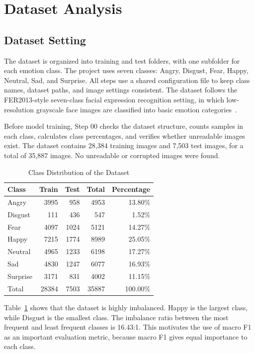 \documentclass[conference]{IEEEtran}
\begin{document}
\section{Dataset Analysis}

\subsection{Dataset Setting}

The dataset is organized into training and test folders, with one subfolder for
each emotion class. The project uses seven classes: Angry, Disgust, Fear,
Happy, Neutral, Sad, and Surprise. All steps use a shared configuration file
to keep class names, dataset paths, and image settings consistent. The dataset
follows the FER2013-style seven-class facial expression recognition setting, in
which low-resolution grayscale face images are classified into basic emotion
categories~\cite{goodfellow2013challenges}.

Before model training, Step 00 checks the dataset structure, counts samples in
each class, calculates class percentages, and verifies whether unreadable
images exist. The dataset contains 28,384 training images and 7,503 test
images, for a total of 35,887 images. No unreadable or corrupted images were
found.

\begin{table}[t]
\centering
\caption{Class Distribution of the Dataset}
\label{tab:dataset_distribution}
\begin{tabular}{lrrrr}
\toprule
Class & Train & Test & Total & Percentage \\
\midrule
Angry & 3995 & 958 & 4953 & 13.80\% \\
Disgust & 111 & 436 & 547 & 1.52\% \\
Fear & 4097 & 1024 & 5121 & 14.27\% \\
Happy & 7215 & 1774 & 8989 & 25.05\% \\
Neutral & 4965 & 1233 & 6198 & 17.27\% \\
Sad & 4830 & 1247 & 6077 & 16.93\% \\
Surprise & 3171 & 831 & 4002 & 11.15\% \\
\midrule
Total & 28384 & 7503 & 35887 & 100.00\% \\
\bottomrule
\end{tabular}
\end{table}

Table~\ref{tab:dataset_distribution} shows that the dataset is highly
imbalanced. Happy is the largest class, while Disgust is the smallest class.
The imbalance ratio between the most frequent and least frequent classes is
16.43:1. This motivates the use of macro F1 as an important evaluation metric,
because macro F1 gives equal importance to each class.
\end{document}
